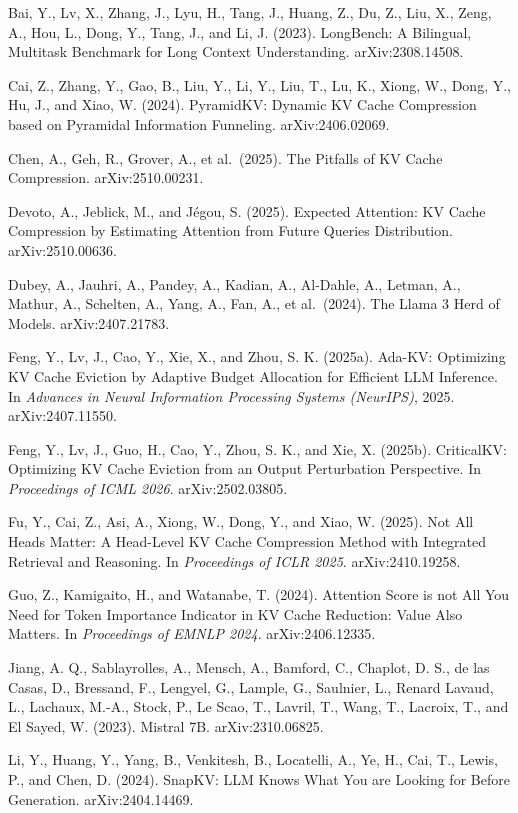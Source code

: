 \documentclass[10pt,letterpaper]{article}
\begin{document}
Bai, Y., Lv, X., Zhang, J., Lyu, H., Tang, J., Huang, Z., Du, Z., Liu,
X., Zeng, A., Hou, L., Dong, Y., Tang, J., and Li, J. (2023). LongBench:
A Bilingual, Multitask Benchmark for Long Context Understanding.
arXiv:2308.14508.

Cai, Z., Zhang, Y., Gao, B., Liu, Y., Li, Y., Liu, T., Lu, K., Xiong,
W., Dong, Y., Hu, J., and Xiao, W. (2024). PyramidKV: Dynamic KV Cache
Compression based on Pyramidal Information Funneling. arXiv:2406.02069.

Chen, A., Geh, R., Grover, A., et al.~(2025). The Pitfalls of KV Cache
Compression. arXiv:2510.00231.

Devoto, A., Jeblick, M., and Jégou, S. (2025). Expected Attention: KV
Cache Compression by Estimating Attention from Future Queries
Distribution. arXiv:2510.00636.

Dubey, A., Jauhri, A., Pandey, A., Kadian, A., Al-Dahle, A., Letman, A.,
Mathur, A., Schelten, A., Yang, A., Fan, A., et al.~(2024). The Llama 3
Herd of Models. arXiv:2407.21783.

Feng, Y., Lv, J., Cao, Y., Xie, X., and Zhou, S. K. (2025a). Ada-KV:
Optimizing KV Cache Eviction by Adaptive Budget Allocation for Efficient
LLM Inference. In \emph{Advances in Neural Information Processing
Systems (NeurIPS)}, 2025. arXiv:2407.11550.

Feng, Y., Lv, J., Guo, H., Cao, Y., Zhou, S. K., and Xie, X. (2025b).
CriticalKV: Optimizing KV Cache Eviction from an Output Perturbation
Perspective. In \emph{Proceedings of ICML 2026}. arXiv:2502.03805.

Fu, Y., Cai, Z., Asi, A., Xiong, W., Dong, Y., and Xiao, W. (2025). Not
All Heads Matter: A Head-Level KV Cache Compression Method with
Integrated Retrieval and Reasoning. In \emph{Proceedings of ICLR 2025}.
arXiv:2410.19258.

Guo, Z., Kamigaito, H., and Watanabe, T. (2024). Attention Score is not
All You Need for Token Importance Indicator in KV Cache Reduction: Value
Also Matters. In \emph{Proceedings of EMNLP 2024}. arXiv:2406.12335.

Jiang, A. Q., Sablayrolles, A., Mensch, A., Bamford, C., Chaplot, D. S.,
de las Casas, D., Bressand, F., Lengyel, G., Lample, G., Saulnier, L.,
Renard Lavaud, L., Lachaux, M.-A., Stock, P., Le Scao, T., Lavril, T.,
Wang, T., Lacroix, T., and El Sayed, W. (2023). Mistral 7B.
arXiv:2310.06825.

Li, Y., Huang, Y., Yang, B., Venkitesh, B., Locatelli, A., Ye, H., Cai,
T., Lewis, P., and Chen, D. (2024). SnapKV: LLM Knows What You are
Looking for Before Generation. arXiv:2404.14469.
\end{document}
